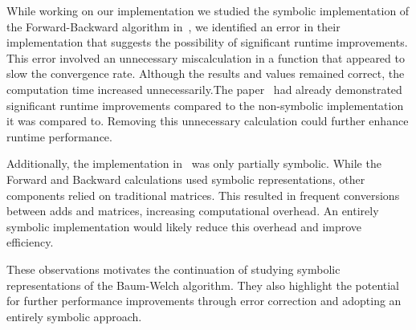 While working on our implementation we studied the symbolic implementation of the Forward-Backward algorithm in~\cite{p7}, we identified an error in their implementation that suggests the possibility of significant runtime improvements. This error involved an unnecessary miscalculation in a function that appeared to slow the convergence rate. Although the results and values remained correct, the computation time increased unnecessarily.The paper~\cite{p7} had already demonstrated significant runtime improvements compared to the non-symbolic implementation it was compared to. Removing this unnecessary calculation could further enhance runtime performance.

Additionally, the implementation in~\cite{p7} was only partially symbolic. While the Forward and Backward calculations used symbolic representations, other components relied on traditional matrices. This resulted in frequent conversions between \glspl{add} and matrices, increasing computational overhead. An entirely symbolic implementation would likely reduce this overhead and improve efficiency.

These observations motivates the continuation of studying symbolic representations of the Baum-Welch algorithm. They also highlight the potential for further performance improvements through error correction and adopting an entirely symbolic approach.


